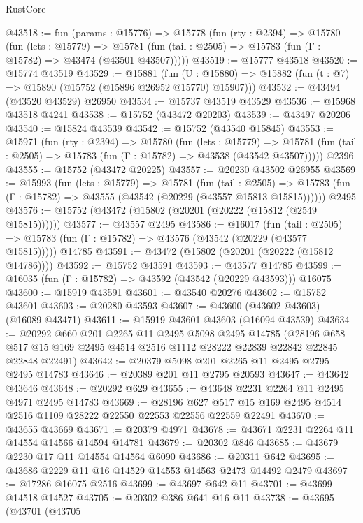 \begin{lexlean}{RustCore}
\begin{coremodule}
@43518 := fun (params : @15776) =>
  @15778
    (fun (rty : @2394) =>
    @15780
      (fun (lets : @15779) =>
      @15781 (fun (tail : @2505) => @15783 (fun (Γ : @15782) => @43474 (@43501 @43507)))))
@43519 := @15777 @43518
@43520 := @15774 @43519
@43529 := @15881
    (fun (U : @15880) => @15882 (fun (t : @7) => @15890 (@15752 (@15896 @26952 @15770) @15907)))
@43532 := @43494 (@43520 @43529) @26950
@43534 := @15737 @43519 @43529
@43536 := @15968 @43518 @4241
@43538 := @15752 (@43472 @20203)
@43539 := @43497 @20206
@43540 := @15824 @43539
@43542 := @15752 (@43540 @15845)
@43553 := @15971
    (fun (rty : @2394) =>
    @15780
      (fun (lets : @15779) =>
      @15781 (fun (tail : @2505) => @15783 (fun (Γ : @15782) => @43538 (@43542 @43507)))))
    @2396
@43555 := @15752 (@43472 @20225)
@43557 := @20230 @43502 @26955
@43569 := @15993
    (fun (lets : @15779) =>
    @15781
      (fun (tail : @2505) =>
      @15783 (fun (Γ : @15782) => @43555 (@43542 (@20229 (@43557 @15813 @15815))))))
    @2495
@43576 := @15752 (@43472 (@15802 (@20201 (@20222 (@15812 (@2549 @15815))))))
@43577 := @43557 @2495
@43586 := @16017
    (fun (tail : @2505) => @15783 (fun (Γ : @15782) => @43576 (@43542 (@20229 (@43577 @15815)))))
    @14785
@43591 := @43472 (@15802 (@20201 (@20222 (@15812 @14786))))
@43592 := @15752 @43591
@43593 := @43577 @14785
@43599 := @16035 (fun (Γ : @15782) => @43592 (@43542 (@20229 @43593))) @16075
@43600 := @15919 @43591
@43601 := @43540 @20276
@43602 := @15752 @43601
@43603 := @20280 @43593
@43607 := @43600 (@43602 @43603) (@16089 @43471)
@43611 := @15919 @43601 @43603 (@16094 @43539)
@43634 := @20292
    @660
    @201
    @2265
    @11
    @2495
    @5098
    @2495
    @14785
    (@28196 @658 @517 @15 @169 @2495 @4514 @2516 @1112 @28222 @22839 @22842 @22845 @22848 @22491)
@43642 := @20379 @5098 @201 @2265 @11 @2495 @2795 @2495 @14783
@43646 := @20389 @201 @11 @2795 @20593
@43647 := @43642 @43646
@43648 := @20292 @629
@43655 := @43648 @2231 @2264 @11 @2495 @4971 @2495 @14783
@43669 := @28196
    @627
    @517
    @15
    @169
    @2495
    @4514
    @2516
    @1109
    @28222
    @22550
    @22553
    @22556
    @22559
    @22491
@43670 := @43655 @43669
@43671 := @20379 @4971
@43678 := @43671 @2231 @2264 @11 @14554 @14566 @14594 @14781
@43679 := @20302 @846
@43685 := @43679 @2230 @17 @11 @14554 @14564 @6090
@43686 := @20311 @642
@43695 := @43686 @2229 @11 @16 @14529 @14553 @14563 @2473 @14492 @2479
@43697 := @17286 @16075 @2516
@43699 := @43697 @642 @11
@43701 := @43699 @14518 @14527
@43705 := @20302 @386 @641 @16 @11
@43738 := @43695
    (@43701
      (@43705

\end{coremodule}
\end{lexlean}
